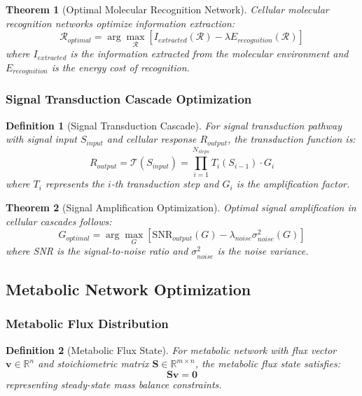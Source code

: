 \documentclass[12pt,a4paper]{article}
\newtheorem{theorem}{Theorem}
\newtheorem{definition}{Definition}
\begin{document}
\begin{theorem}[Optimal Molecular Recognition Network]
Cellular molecular recognition networks optimize information extraction:
\begin{equation}
\mathcal{R}_{optimal} = \arg\max_{\mathcal{R}} \left[ I_{extracted}(\mathcal{R}) - \lambda E_{recognition}(\mathcal{R}) \right]
\end{equation}
where $I_{extracted}$ is the information extracted from the molecular environment and $E_{recognition}$ is the energy cost of recognition.
\end{theorem}

\subsubsection{Signal Transduction Cascade Optimization}

\begin{definition}[Signal Transduction Cascade]
For signal transduction pathway with signal input $S_{input}$ and cellular response $R_{output}$, the transduction function is:
\begin{equation}
R_{output} = \mathcal{T}(S_{input}) = \prod_{i=1}^{N_{steps}} T_i(S_{i-1}) \cdot G_i
\end{equation}
where $T_i$ represents the $i$-th transduction step and $G_i$ is the amplification factor.
\end{definition}

\begin{theorem}[Signal Amplification Optimization]
Optimal signal amplification in cellular cascades follows:
\begin{equation}
G_{optimal} = \arg\max_G \left[ \text{SNR}_{output}(G) - \lambda_{noise} \sigma_{noise}^2(G) \right]
\end{equation}
where SNR is the signal-to-noise ratio and $\sigma_{noise}^2$ is the noise variance.
\end{theorem}

\subsection{Metabolic Network Optimization}

\subsubsection{Metabolic Flux Distribution}

\begin{definition}[Metabolic Flux State]
For metabolic network with flux vector $\mathbf{v} \in \mathbb{R}^n$ and stoichiometric matrix $\mathbf{S} \in \mathbb{R}^{m \times n}$, the metabolic flux state satisfies:
\begin{equation}
\mathbf{S} \mathbf{v} = \mathbf{0}
\end{equation}
representing steady-state mass balance constraints.
\end{definition}
\end{document}
